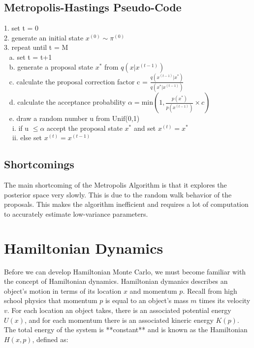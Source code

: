 \documentclass{article}
\begin{document}
\subsection{Metropolis-Hastings Pseudo-Code}

1. set t = 0\\
2. generate an initial state $x^{(0)} \sim \pi^{(0)}$\\
3. repeat until t = M\\
$~~$ a. set t = t+1\\
$~~$ b. generate a proposal state $x^*$ from $q(x | x^{(t-1)})$\\
$~~$ c. calculate the proposal correction factor c = $\frac{q(x^{(t-1)} | x^*) }{q(x^*|x^{(t-1)})}$\\
$~~$ d. calculate the acceptance probability $\alpha = \text{min} \left (1,\frac{p(x^*)}{p(x^{(t-1)})} \times c\right )$ \\
$~~$ e. draw a random number u from $\text{Unif}$(0,1)\\
$~~~~$ i. if u $\leq \alpha$ accept the proposal state $x^*$ and set $x^{(t)}=x^*$\\
$~~~~$ ii. else set $x^{(t)} = x^{(t-1)}$

\subsection{Shortcomings}

The main shortcoming of the Metropolis Algorithm is that it explores the posterior space very slowly. This is due to the random walk behavior of the proposals. This makes the algorithm inefficient and requires a lot of computation to accurately estimate low-variance parameters.

\section{Hamiltonian Dynamics}

Before we can develop Hamiltonian Monte Carlo, we must become familiar with the concept of Hamiltonian dynamics. Hamiltonian dymanics describes an object's motion in terms of its location $x$ and momentum $p$. Recall from high school physics that momentum $p$ is equal to an object's mass $m$ times its velocity $v$. For each location an object takes, there is an associated potential energy $U(x)$, and for each momentum there is an associated kineric energy $K(p)$. The total energy of the system is **constant** and is known as the Hamiltonian $H(x,p)$, defined as:
\\
\end{document}
